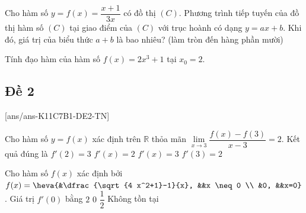 \begin{ex}%
Cho hàm số $y=f(x)=\dfrac{x+1}{3 x}$ có đồ thị $(C)$.
Phương trình tiếp tuyến của đồ thị hàm số $(C)$ tại giao điểm của $(C)$ với trục hoành có dạng $ y=ax+b $. Khi đó, giá trị của biểu thức $ a+b $ là bao nhiêu? (làm tròn đến hàng phần mười)
\end{ex}

\begin{ex}%
Tính đạo hàm của hàm số $f(x)=2 x^3+1$ tại $x_0=2$.
\end{ex}


\subsection{Đề 2}
\setcounter{ex}{0}
[ans/ans-K11C7B1-DE2-TN]
\caulc
\begin{ex}%
Cho hàm số $y=f(x)$ xác định trên $\mathbb{R}$ thỏa mãn $\lim\limits_{x \rightarrow 3} \dfrac{f(x)-f(3)}{x-3}=2$. Kết quả đúng là
\choice
{$f'(2)=3$}
{$f'(x)=2$}
{$f'(x)=3$}
{\True $f'(3)=2$}
\end{ex}

\begin{ex}%
Cho hàm số $f(x)$ xác định bởi $f(x)=\heva{&\dfrac{\sqrt{4 x^2+1}-1}{x}, &&x \neq 0 \\ &0, &&x=0}$. Giá trị $f'(0)$ bằng
\choice
{\True $ 2 $}
{$ 0 $}
{$\dfrac{1}{2}$}
{Không tồn tại}
\end{ex}

